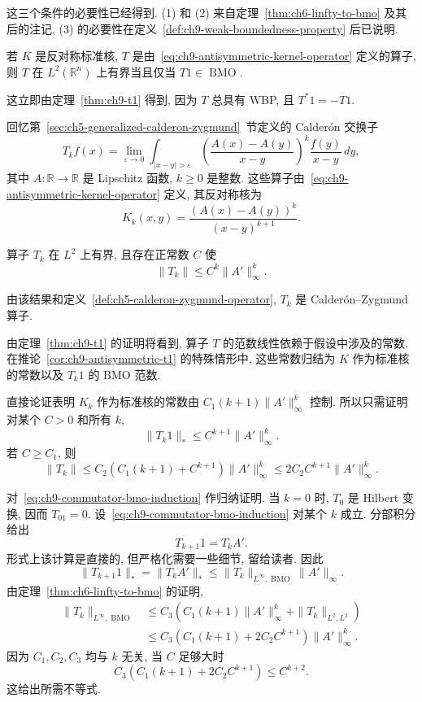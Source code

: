 这三个条件的必要性已经得到. (1) 和 (2) 来自定理~\ref{thm:ch6-linfty-to-bmo} 及其后的注记, (3) 的必要性在定义~\ref{def:ch9-weak-boundedness-property} 后已说明.

\begin{Corollary}
\label{cor:ch9-antisymmetric-t1}
若 $K$ 是反对称标准核, $T$ 是由~\eqref{eq:ch9-antisymmetric-kernel-operator} 定义的算子, 则 $T$ 在 $L^2(\mathbb R^n)$ 上有界当且仅当 $T1\in\operatorname{BMO}$.
\end{Corollary}

这立即由定理~\ref{thm:ch9-t1} 得到, 因为 $T$ 总具有 WBP, 且 $T^*1=-T1$.

\begin{Example}
\label{ex:ch9-calderon-commutators}
回忆第~\ref{sec:ch5-generalized-calderon-zygmund}~节定义的 Calderón 交换子
\[
 T_kf(x)=\lim_{\varepsilon\to0}
 \int_{|x-y|>\varepsilon}
 \left(\frac{A(x)-A(y)}{x-y}\right)^k\frac{f(y)}{x-y}\,dy,
\]
其中 $A:\mathbb R\to\mathbb R$ 是 Lipschitz 函数, $k\ge0$ 是整数. 这些算子由~\eqref{eq:ch9-antisymmetric-kernel-operator} 定义, 其反对称核为
\[
 K_k(x,y)=\frac{(A(x)-A(y))^k}{(x-y)^{k+1}}.
\]
\end{Example}

\hypertarget{chapter-09-page-216}{}
\begin{Corollary}
\label{cor:ch9-calderon-commutator-bounds}
算子 $T_k$ 在 $L^2$ 上有界, 且存在正常数 $C$ 使
\[
 \|T_k\|\le C^k\|A'\|_\infty^k.
\]
\end{Corollary}

由该结果和定义~\ref{def:ch5-calderon-zygmund-operator}, $T_k$ 是 Calderón--Zygmund 算子.

\begin{Proof}
由定理~\ref{thm:ch9-t1} 的证明将看到, 算子 $T$ 的范数线性依赖于假设中涉及的常数. 在推论~\ref{cor:ch9-antisymmetric-t1} 的特殊情形中, 这些常数归结为 $K$ 作为标准核的常数以及 $T_k1$ 的 BMO 范数.

直接论证表明 $K_k$ 作为标准核的常数由 $C_1(k+1)\|A'\|_\infty^k$ 控制. 所以只需证明对某个 $C>0$ 和所有 $k$,
\begin{equation}
 \|T_k1\|_*\le C^{k+1}\|A'\|_\infty^k.
 \label{eq:ch9-commutator-bmo-induction}
\end{equation}
若 $C\ge C_1$, 则
\[
 \|T_k\|\le C_2(C_1(k+1)+C^{k+1})\|A'\|_\infty^k
 \le2C_2C^{k+1}\|A'\|_\infty^k.
\]

对~\eqref{eq:ch9-commutator-bmo-induction} 作归纳证明. 当 $k=0$ 时, $T_0$ 是 Hilbert 变换, 因而 $T_01=0$. 设~\eqref{eq:ch9-commutator-bmo-induction} 对某个 $k$ 成立. 分部积分给出
\[
 T_{k+1}1=T_kA'.
\]
形式上该计算是直接的, 但严格化需要一些细节, 留给读者. 因此
\[
 \|T_{k+1}1\|_*=\|T_kA'\|_*
 \le\|T_k\|_{L^\infty,\operatorname{BMO}}\|A'\|_\infty.
\]
由定理~\ref{thm:ch6-linfty-to-bmo} 的证明,
\[
 \begin{aligned}
 \|T_k\|_{L^\infty,\operatorname{BMO}}
 &\le C_3(C_1(k+1)\|A'\|_\infty^k+\|T_k\|_{L^2,L^2})\\
 &\le C_3(C_1(k+1)+2C_2C^{k+1})\|A'\|_\infty^k.
 \end{aligned}
\]
因为 $C_1,C_2,C_3$ 均与 $k$ 无关, 当 $C$ 足够大时
\[
 C_3(C_1(k+1)+2C_2C^{k+1})\le C^{k+2}.
\]
这给出所需不等式.
\end{Proof}

